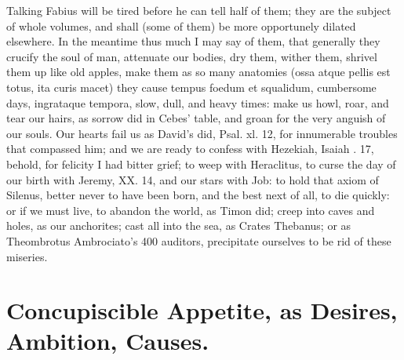 {Talking Fabius will be tired before he can tell half of them; they are
the subject of whole volumes, and shall (some of them) be more
opportunely dilated elsewhere. In the meantime thus much I may say of
them, that generally they crucify the soul of man, attenuate our
bodies, dry them, wither them, shrivel them up like old apples, make
them as so many anatomies (ossa atque pellis est totus, ita curis
macet) they cause tempus foedum et squalidum, cumbersome days,
ingrataque tempora, slow, dull, and heavy times: make us howl, roar,
and tear our hairs, as sorrow did in Cebes' table, and groan for
the very anguish of our souls. Our hearts fail us as David's did, Psal.
xl. 12, for innumerable troubles that compassed him; and we are ready
to confess with Hezekiah, Isaiah . 17, behold, for felicity I had
bitter grief; to weep with Heraclitus, to curse the day of our birth
with Jeremy, XX. 14, and our stars with Job: to hold that axiom of
Silenus, better never to have been born, and the best next of
all, to die quickly: or if we must live, to abandon the world, as Timon
did; creep into caves and holes, as our anchorites; cast all into the
sea, as Crates Thebanus; or as Theombrotus Ambrociato's 400 auditors,
precipitate ourselves to be rid of these miseries.

\section{Concupiscible Appetite, as Desires, Ambition, Causes.}

}
